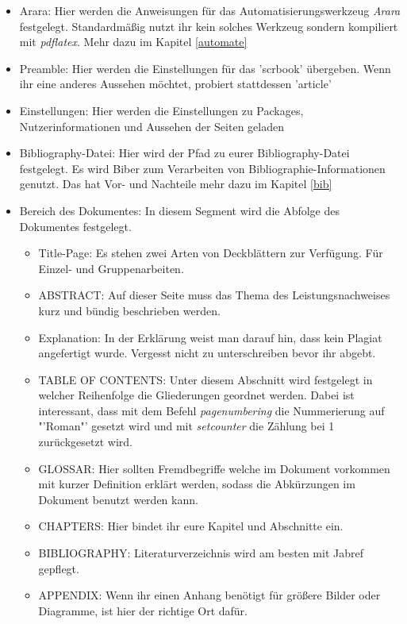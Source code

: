 \begin{itemize}
	\item Arara: Hier werden die Anweisungen für das Automatisierungswerkzeug \emph{Arara} festgelegt. Standardmäßig nutzt ihr kein solches Werkzeug sondern kompiliert mit \emph{pdflatex}. Mehr dazu im Kapitel \ref{automate}
	\item Preamble: Hier werden die Einstellungen für das 'scrbook' übergeben. Wenn ihr eine anderes Aussehen möchtet, probiert stattdessen 'article'
	\item Einstellungen: Hier werden die Einstellungen zu Packages, Nutzerinformationen und Aussehen der Seiten geladen
	\item Bibliography-Datei: Hier wird der Pfad zu eurer Bibliography-Datei festgelegt. Es wird Biber zum Verarbeiten von Bibliographie-Informationen genutzt. Das hat Vor- und Nachteile mehr dazu im Kapitel \ref{bib} 
	\item Bereich des Dokumentes: In diesem Segment wird die Abfolge des Dokumentes festgelegt. 
	\begin{itemize}
		\item Title-Page: Es stehen zwei Arten von Deckblättern zur Verfügung. Für Einzel- und Gruppenarbeiten.
		\item ABSTRACT: Auf dieser Seite muss das Thema des Leistungsnachweises kurz und bündig beschrieben werden.
		\item Explanation: In der Erklärung weist man darauf hin, dass kein Plagiat angefertigt wurde. Vergesst nicht zu unterschreiben bevor ihr abgebt.
		\item TABLE OF CONTENTS: Unter diesem Abschnitt wird festgelegt in welcher Reihenfolge die Gliederungen geordnet werden. Dabei ist interessant, dass mit dem Befehl \emph{pagenumbering} die Nummerierung auf "'Roman"' gesetzt wird und mit \emph{setcounter} die Zählung bei 1 zurückgesetzt wird.
		\item GLOSSAR: Hier sollten Fremdbegriffe welche im Dokument vorkommen mit kurzer Definition erklärt werden, sodass die Abkürzungen im Dokument benutzt werden kann.
		\item CHAPTERS: Hier bindet ihr eure Kapitel und Abschnitte ein.
		\item BIBLIOGRAPHY: Literaturverzeichnis wird am besten mit Jabref gepflegt.
		\item APPENDIX: Wenn ihr einen Anhang benötigt für größere Bilder oder Diagramme, ist hier der richtige Ort dafür.
	\end{itemize}
\end{itemize}


